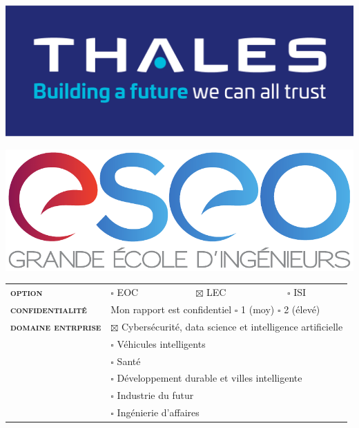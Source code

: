 \documentclass[a4paper]{article}
\begin{document}
\begin{titlepage}
	\enlargethispage{2cm}

	\begin{center}

		\textsc{\@title}
		\vspace*{0.5cm}

		\large{\@author}

		\vspace*{0.5cm}
		\large{\LARGE{\textbf{\Subject}}}
		
		\Dates

		\vspace*{0.5cm}
		\includegraphics[scale=0.5]{data/Thales_LOGO.png}

		\vspace*{1cm}
		\includegraphics[scale=0.75]{data/ESEO_LOGO.pdf}

	\end{center}

	\vfill

	\begin{tabular}{llll}
		\textsc{\textbf{option}} 
			& $\square$ EOC & $\boxtimes$ LEC & $\square$ ISI \\
		\textsc{\textbf{confidentialité}} 
			& \multicolumn{3}{l}{Mon rapport est confidentiel $\square$ 1 (moy) $\square$ 2 (élevé)} \\
		\textsc{\textbf{domaine entrprise}}	
			& \multicolumn{3}{l}{$\boxtimes$ Cybersécurité, data science et intelligence artificielle} \\
			& \multicolumn{3}{l}{$\square$ Véhicules intelligents} \\
			& \multicolumn{3}{l}{$\square$ Santé} \\
			& \multicolumn{3}{l}{$\square$ Développement durable et villes intelligente}\\
			& \multicolumn{3}{l}{$\square$ Industrie du futur} \\
			& \multicolumn{3}{l}{$\square$ Ingénierie d'affaires} \\		
	\end{tabular}


\end{titlepage}
\end{document}
